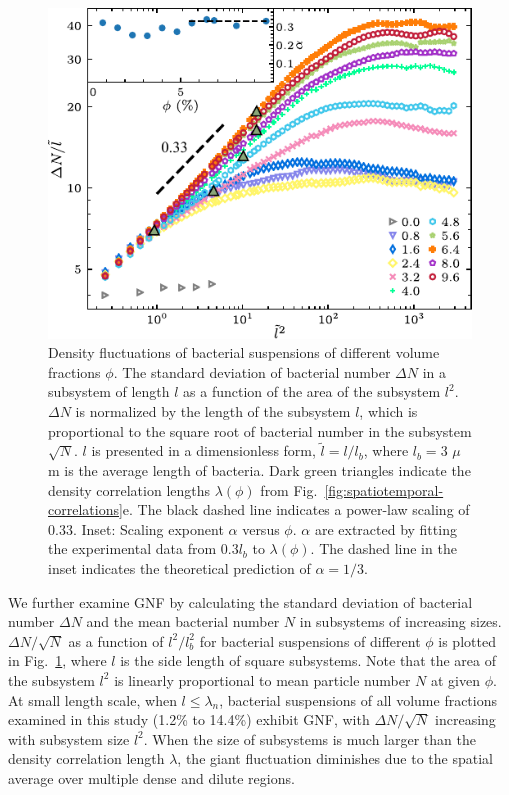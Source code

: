 \begin{figure}[!ht]
\begin{center}
\includegraphics[width=4.5in]{figs/5-GNF/4.pdf}
\caption[Giant number fluctuations in active turbulence]
{
Density fluctuations of bacterial suspensions of different volume fractions $\phi$. The standard deviation of bacterial number $\Delta N$ in a subsystem of length $l$ as a function of the area of the subsystem $l^2$. $\Delta N$ is normalized by the length of the subsystem $l$, which is proportional to the square root of bacterial number in the subsystem $\sqrt N$. $l$ is presented in a dimensionless form, $\tilde{l} = l/l_b$, where $l_b = 3$ $\mu$m is the average length of bacteria. Dark green triangles indicate the density correlation lengths $\lambda(\phi)$ from Fig.~\ref{fig:spatiotemporal-correlations}e. The black dashed line indicates a power-law scaling of 0.33.
Inset: Scaling exponent $\alpha$ versus $\phi$. $\alpha$ are extracted by fitting the experimental data from 0.3$l_b$ to $\lambda(\phi)$. The dashed line in the inset indicates the theoretical prediction of $\alpha=1/3$.
}
\label{fig:GNF}
\end{center}
\end{figure}

We further examine GNF by calculating the standard deviation of bacterial number $\Delta N$ and the mean bacterial number $N$ in subsystems of increasing sizes. $\Delta N / \sqrt N$ as a function of $l^2/l_b^2$ for bacterial suspensions of different $\phi$ is plotted in Fig.~\ref{fig:GNF}, where $l$ is the side length of square subsystems.
Note that the area of the subsystem $l^2$ is linearly proportional to mean particle number $N$ at given $\phi$. At small length scale, when $l\le\lambda_n$, bacterial suspensions of all volume fractions examined in this study (1.2\% to 14.4\%) exhibit GNF, with $\Delta N/\sqrt N$ increasing with subsystem size $l^2$. When the size of subsystems is much larger than the density correlation length $\lambda$, the giant fluctuation diminishes due to the spatial average over multiple dense and dilute regions.

